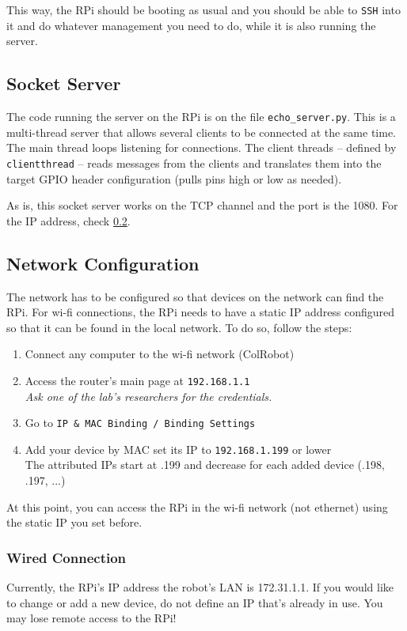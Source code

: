 \documentclass[twoside,a4paper]{refart}
\begin{document}
This way, the RPi should be booting as usual and you should be able to {\tt SSH} into it and do whatever management you need to do, while it is also running the server.


\subsection{Socket Server}\label{sub:socket_server}
The code running the server on the RPi is on the file {\tt echo\_server.py}. This is a multi-thread server that allows several clients to be connected at the same time. The main thread loops listening for connections. The client threads -- defined by {\tt clientthread} -- reads messages from the clients and translates them into the target GPIO header configuration (pulls pins high or low as needed).

As is, this socket server works on the TCP channel and the port is the 1080. For the IP address, check \cref{sub:network_conf}.


\subsection{Network Configuration}\label{sub:network_conf}
The network has to be configured so that devices on the network can find the RPi. For wi-fi connections, the RPi needs to have a static IP address configured so that it can be found in the local network. To do so, follow the steps:
\begin{enumerate}
	\item
	Connect any computer to the wi-fi network (ColRobot)
	\item
	Access the router's main page at {\tt 192.168.1.1} \\
	\emph{Ask one of the lab's researchers for the credentials.}
	\item
	Go to {\tt IP \& MAC Binding / Binding Settings}
	\item
	Add your device by MAC set its IP to {\tt 192.168.1.199} or lower \\
	The attributed IPs start at .199 and decrease for each added device (.198, .197, ...)
\end{enumerate}
At this point, you can access the RPi in the wi-fi network (not ethernet) using the static IP you set before.

\subsubsection{Wired Connection}
Currently, the RPi's IP address the robot's LAN is 172.31.1.1. If you would like to change or add a new device, do not define an IP that's already in use. You may lose remote access to the RPi!
\end{document}

